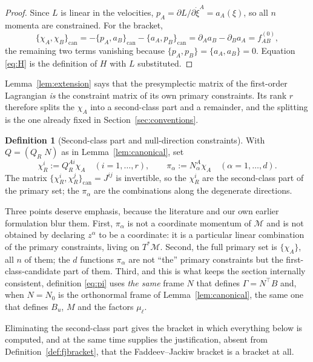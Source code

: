 \documentclass[12pt]{article}
\theoremstyle{plain}
\theoremstyle{definition}
\newtheorem{definition}[theorem]{Definition}
\theoremstyle{remark}
\newcommand{\pd}[1]{\partial_{#1}}
\newcommand{\Mm}{\mathcal{M}}
\begin{document}
	\begin{proof}
		Since $L$ is linear in the velocities, $p_{A}=\partial L/\partial\dot\xi^{A}
		=a_{A}(\xi)$, so all $n$ momenta are constrained. For the bracket,
		\[
		\{\chi_{A},\chi_{B}\}_{\mathrm{can}}
		=-\{p_{A},a_{B}\}_{\mathrm{can}}-\{a_{A},p_{B}\}_{\mathrm{can}}
		=\pd{A}a_{B}-\pd{B}a_{A}=f^{(0)}_{AB},
		\]
		the remaining two terms vanishing because $\{p_{A},p_{B}\}=\{a_{A},a_{B}\}=0$.
		Equation \eqref{eq:H} is the definition of $H$ with $L$ substituted.
	\end{proof}
	
	Lemma~\ref{lem:extension} says that the presymplectic matrix of the first-order
	Lagrangian \emph{is} the constraint matrix of its own primary constraints. Its
	rank $r$ therefore splits the $\chi_{A}$ into a second-class part and a
	remainder, and the splitting is the one already fixed in
	Section~\ref{sec:conventions}.
	
	\begin{definition}[Second-class part and null-direction constraints]
		\label{def:pi}
		With $Q=(Q_{R}\;N)$ as in Lemma~\ref{lem:canonical}, set
		\begin{equation}
			\chi^{i}_{R}:=Q_{R}^{Ai}\chi_{A}\quad(i=1,\dots,r),
			\qquad
			\pi_{\alpha}:=N_{\alpha}^{A}\chi_{A}\quad(\alpha=1,\dots,d).
			\label{eq:pi}
		\end{equation}
		The matrix $\{\chi_{R}^{i},\chi_{R}^{j}\}_{\mathrm{can}}=J^{ij}$ is invertible,
		so the $\chi_{R}^{i}$ are the second-class part of the primary set; the
		$\pi_{\alpha}$ are the combinations along the degenerate directions.
	\end{definition}
	
	Three points deserve emphasis, because the literature and our own earlier
	formulation blur them. First, $\pi_{\alpha}$ is not a coordinate momentum of
	$\Mm$ and is not obtained by declaring $z^{\alpha}$ to be a coordinate: it is a
	particular linear combination of the primary constraints, living on
	$T^{*}\Mm$. Second, the full primary set is $\{\chi_{A}\}$, all $n$ of them; the
	$d$ functions $\pi_{\alpha}$ are not ``the'' primary constraints but the
	first-class-candidate part of them. Third, and this is what keeps the section
	internally consistent, definition \eqref{eq:pi} uses \emph{the same} frame
	$N$ that defines $\Gamma=N^{\top}B$ and, when $N=N_{0}$ is the orthonormal frame
	of Lemma~\ref{lem:canonical}, the same one that defines $B_{u}$, $M$ and the
	factors $\mu_{\ell}$.
	
	Eliminating the second-class part gives the bracket in which everything below is
	computed, and at the same time supplies the justification, absent from
	Definition~\ref{def:fjbracket}, that the Faddeev--Jackiw bracket is a bracket at
	all.
	
\end{document}
